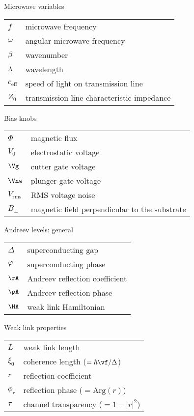 {\Large\noindent Microwave variables}
\vspace{-.2cm}
\begin{longtable}{ m{5em} m{29em}}
$f$ & microwave frequency \\
$\omega$ & angular microwave frequency \\
$\beta$ & wavenumber  \\
$\lambda$ & wavelength\\
$c_\mathrm{eff}$ & speed of light on transmission line \\
$Z_0$ & transmission line characteristic impedance \\
\end{longtable}
\vspace{.2cm}

{\Large\noindent Bias knobs}
\vspace{-.2cm}
\begin{longtable}{ m{5em} m{29em}}
$\Phi$ & magnetic flux  \\
$V_0$ & electrostatic voltage  \\
$\Vg$ & cutter gate voltage  \\
$\Vnw$ & plunger gate voltage  \\
$V_\mathrm{rms}$ & RMS voltage noise \\
$B_\perp$ & magnetic field perpendicular to the substrate\\
\end{longtable}
\vspace{.2cm}

{\Large\noindent Andreev levels: general}
\vspace{-.2cm}
\begin{longtable}{ m{5em} m{29em}}
$\Delta$ & superconducting gap \\
$\varphi$ & superconducting phase  \\
$\rA$ & Andreev reflection coefficient \\
$\pA$ & Andreev reflection phase \\
$\HA$ & weak link Hamiltonian\\
\end{longtable}
\vspace{.2cm}

{\Large\noindent Weak link properties}
\vspace{-.2cm}
\begin{longtable}{ m{5em} m{29em}}
$L$ & weak link length \\
$\xi_0$ & coherence length ($=\hbar \vf/\Delta$) \\
$r$ & reflection coefficient \\
$\phi_r$ & reflection phase ($=\mathrm{Arg}(r)$) \\
$\tau$ & channel transparency ($=1 - |r|^2$) \\
\end{longtable}
\vspace{.2cm}

